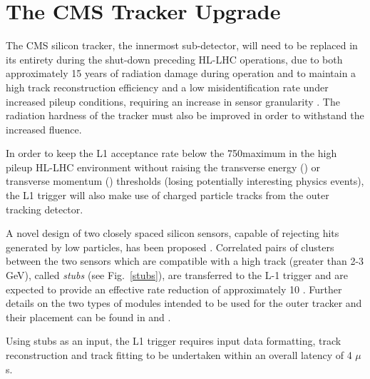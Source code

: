 \section{The CMS Tracker Upgrade}\label{sec:tk-upgrade}
 
The CMS silicon tracker, the innermost sub-detector, will need to be replaced in its entirety during the shut-down preceding HL-LHC operations, due to both approximately 15 years of radiation damage during operation and to maintain a high track reconstruction efficiency and a low misidentification rate under increased pileup conditions, requiring an increase in sensor granularity \cite{P2TrackerTDR}. The radiation hardness of the tracker must also be improved in order to withstand the increased fluence.

In order to keep the L1 acceptance rate below the 750\kHz maximum in the high pileup HL-LHC environment without raising the transverse energy (\ET) or transverse momentum (\pT) thresholds (losing potentially interesting physics events), the L1 trigger will also make use of charged particle tracks from the outer tracking detector.
 
A novel design of two closely spaced silicon sensors, capable of rejecting hits generated by low \pT particles, has been proposed \cite{jjonespixel,markthesis}. Correlated pairs of clusters between the two sensors which are compatible with a high \pT track (greater than 2-3 GeV), called \textit{stubs} (see Fig.~\ref{stubs}), are transferred to the L-1 trigger and are expected to provide an effective rate reduction of approximately 10 \cite{mpessimperf,2dptmoduleconcept}. Further details on the two types of \pT modules intended to be used for the outer tracker and their placement can be found in \cite{CMS_Upgrade_TP} and \cite{P2TrackerTDR}.

Using stubs as an input, the L1 trigger requires input data formatting, track reconstruction and track fitting to be undertaken within an overall latency of 4 $\mu$s.  

